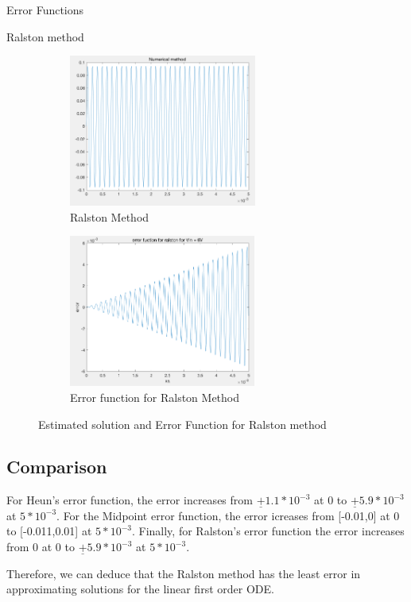 \documentclass[10pt,a4paper]{article}
\begin{document}
\begin{subsection}{Error Functions}
\begin{subsection}{Ralston method}
\begin{figure}[h]
\begin{subfigure}{.5\textwidth}
  \includegraphics[width=.9\linewidth,height = 5cm
  ]{ralston_error_numerical_method}
  \caption[right]{Ralston Method}
  \label{fig:ralston_method}
\end{subfigure}
\begin{subfigure}{.5\textwidth}
  \includegraphics[width=.9\linewidth,height = 5cm]{ralston_error}
  \caption{Error function for Ralston Method}
  \label{fig:ralston_error}
\end{subfigure}
\caption{Estimated solution and Error Function for Ralston method}
\label{fig:Ralston_Error_sub}
\end{figure}


\end{subsection}
\clearpage

\subsection{Comparison}
For Heun's error function, the error increases from
$\underline{+}1.1*10^{-3}$ at 0 to $\underline{+}5.9*10^{-3}$ at $5*10^{-3}$. For the Midpoint error function, the error icreases from [-0.01,0] at 0 to [-0.011,0.01] at $5*10^{-3}$.
Finally, for Ralston's error function the error increases from 0 at 0 to $\underline{+}5.9*10^{-3}$ at $5*10^{-3}$.

Therefore, we can deduce that the Ralston method has the least error in approximating solutions for the linear first order ODE. %


\end{subsection}
\end{document}
